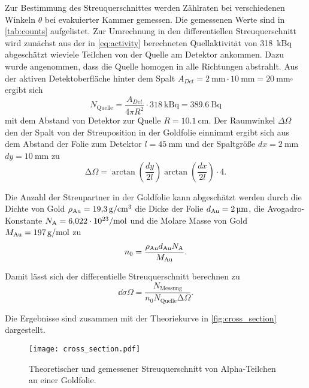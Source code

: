 Zur Bestimmung des Streuquerschnittes werden Zählraten bei verschiedenen Winkeln $\theta$ bei evakuierter Kammer gemessen.
Die gemessenen Werte sind in \autoref{tab:counts} aufgelistet. Zur Umrechnung in den differentiellen Streuquerschnitt wird zunächst
aus der in \eqref{eq:activity} berechneten Quellaktivität von \SI{318}{\kilo \becquerel} abgeschätzt wieviele Teilchen von der Quelle
am Detektor ankommen. Dazu wurde angenommen, dass die Quelle homogen in alle Richtungen abstrahlt.
Aus der aktiven Detektoberfläche hinter dem Spalt $A_{Det} = \SI{2}{\mm} \cdot \SI{10}{\mm} = \SI{20}{\milli \meter \square}$ ergibt sich
\begin{equation}
  \label{eq:rate}
  N_\text{Quelle} = \frac{A_{Det}}{4  \pi  R^2} \cdot \SI{318}{\kilo \becquerel} = \SI{389.6}{\becquerel}
\end{equation}
mit dem Abstand von Detektor zur Quelle $R = \SI{10,1}{\centi \meter}$.
Der Raumwinkel $\Delta \Omega$ den der Spalt von der Streuposition in der Goldfolie einnimmt ergibt sich aus dem Abstand der Folie zum Detektor
$l = \SI{45}{\mm}$ und der Spaltgröße $dx = \SI{2}{\mm}$ $dy = \SI{10}{\mm}$ zu
\begin{equation}
\increment \Omega = \arctan(\frac{dy}{2  l})  \arctan(\frac{dx}{2  l}) \cdot 4.
\end{equation}

Die Anzahl der Streupartner in der Goldfolie kann abgeschätzt werden durch die Dichte von Gold $\rho_{\ce{Au}} =  \SI{19.3}{\gram \per \cubic \centi \meter}$
die Dicke der Folie $d_{\ce{Au}}  = \SI{2}{\micro \meter}$, die Avogadro-Konstante $N_\text{A} = \SI{6,022E23}{\per \mol}$ und die Molare Masse
von Gold $M_{\ce{Au}} = \SI{197}{\gram \per \mol}$ zu
\begin{equation}
  n_0 = \frac{\rho_{\ce{Au}}  d_{\ce{Au}} N_\text{A} }{M_{\ce{Au}}}.
\end{equation}

Damit lässt sich der differentielle Streuquerschnitt berechnen zu
\begin{equation}
  \dd{\sigma}{\Omega} = \frac{N_\text{Messung}}{n_0 N_\text{Quelle} \increment \Omega}.
\end{equation}

Die Ergebnisse sind zusammen mit der Theoriekurve in \autoref{fig:cross_section} dargestellt.
\begin{figure}
  \centering
  \texttt{[image: cross\_section.pdf]}
  \caption{%
    Theoretischer und gemessener Streuquerschnitt von Alpha-Teilchen an einer Goldfolie.
  }\label{fig:cross_section}
\end{figure}
